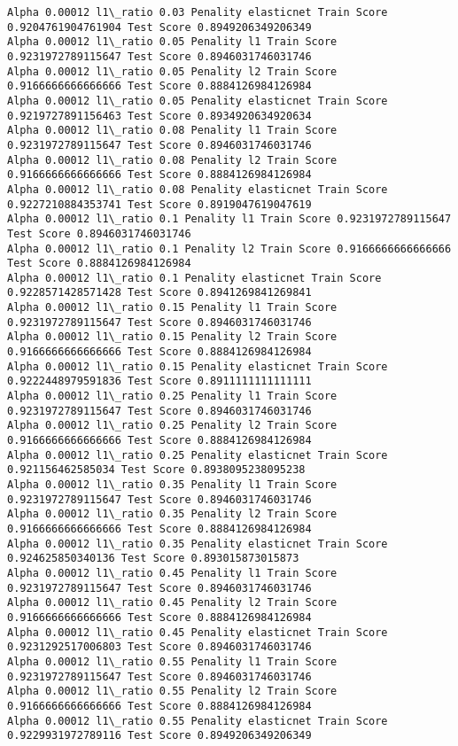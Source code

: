 \documentclass[11pt]{article}
\begin{document}
\begin{Verbatim}[commandchars=\\\{\}]
Alpha 0.00012 l1\_ratio 0.03 Penality elasticnet Train Score 0.9204761904761904 Test Score 0.8949206349206349
Alpha 0.00012 l1\_ratio 0.05 Penality l1 Train Score 0.9231972789115647 Test Score 0.8946031746031746
Alpha 0.00012 l1\_ratio 0.05 Penality l2 Train Score 0.9166666666666666 Test Score 0.8884126984126984
Alpha 0.00012 l1\_ratio 0.05 Penality elasticnet Train Score 0.9219727891156463 Test Score 0.8934920634920634
Alpha 0.00012 l1\_ratio 0.08 Penality l1 Train Score 0.9231972789115647 Test Score 0.8946031746031746
Alpha 0.00012 l1\_ratio 0.08 Penality l2 Train Score 0.9166666666666666 Test Score 0.8884126984126984
Alpha 0.00012 l1\_ratio 0.08 Penality elasticnet Train Score 0.9227210884353741 Test Score 0.8919047619047619
Alpha 0.00012 l1\_ratio 0.1 Penality l1 Train Score 0.9231972789115647 Test Score 0.8946031746031746
Alpha 0.00012 l1\_ratio 0.1 Penality l2 Train Score 0.9166666666666666 Test Score 0.8884126984126984
Alpha 0.00012 l1\_ratio 0.1 Penality elasticnet Train Score 0.9228571428571428 Test Score 0.8941269841269841
Alpha 0.00012 l1\_ratio 0.15 Penality l1 Train Score 0.9231972789115647 Test Score 0.8946031746031746
Alpha 0.00012 l1\_ratio 0.15 Penality l2 Train Score 0.9166666666666666 Test Score 0.8884126984126984
Alpha 0.00012 l1\_ratio 0.15 Penality elasticnet Train Score 0.9222448979591836 Test Score 0.8911111111111111
Alpha 0.00012 l1\_ratio 0.25 Penality l1 Train Score 0.9231972789115647 Test Score 0.8946031746031746
Alpha 0.00012 l1\_ratio 0.25 Penality l2 Train Score 0.9166666666666666 Test Score 0.8884126984126984
Alpha 0.00012 l1\_ratio 0.25 Penality elasticnet Train Score 0.921156462585034 Test Score 0.8938095238095238
Alpha 0.00012 l1\_ratio 0.35 Penality l1 Train Score 0.9231972789115647 Test Score 0.8946031746031746
Alpha 0.00012 l1\_ratio 0.35 Penality l2 Train Score 0.9166666666666666 Test Score 0.8884126984126984
Alpha 0.00012 l1\_ratio 0.35 Penality elasticnet Train Score 0.924625850340136 Test Score 0.893015873015873
Alpha 0.00012 l1\_ratio 0.45 Penality l1 Train Score 0.9231972789115647 Test Score 0.8946031746031746
Alpha 0.00012 l1\_ratio 0.45 Penality l2 Train Score 0.9166666666666666 Test Score 0.8884126984126984
Alpha 0.00012 l1\_ratio 0.45 Penality elasticnet Train Score 0.9231292517006803 Test Score 0.8946031746031746
Alpha 0.00012 l1\_ratio 0.55 Penality l1 Train Score 0.9231972789115647 Test Score 0.8946031746031746
Alpha 0.00012 l1\_ratio 0.55 Penality l2 Train Score 0.9166666666666666 Test Score 0.8884126984126984
Alpha 0.00012 l1\_ratio 0.55 Penality elasticnet Train Score 0.9229931972789116 Test Score 0.8949206349206349

\end{Verbatim}
\end{document}
